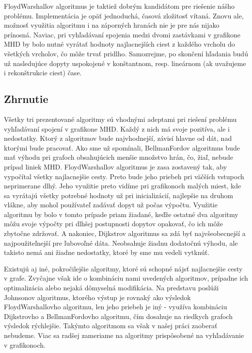 Floyd\textendash Warshallov algoritmus je taktiež dobrým kandidátom pre riešenie nášho problému. Implementácia je opäť jednoduchá, časová zložitosť vítaná. Znovu ale, možnosť využitia algoritmu i na záporných hranách nie je pre nás nijako prínosná. Naviac, pri vyhľadávaní spojenia medzi dvomi zastávkami v grafikone MHD by bolo nutné vyrátať hodnoty najlacnejších ciest z každého vrcholu do všetkých vrcholov, čo môže trvať pridlho. Samozrejme, po skončení hľadania budú už nasledujúce dopyty uspokojené v konštantnom, resp. lineárnom (ak uvažujeme i rekonštrukcie ciest) čase.\newline


\subsection{Zhrnutie}
\label{vyhlad_alg_zhrnutie}

Všetky tri prezentované algoritmy sú vhodnými adeptami pri riešení problému vyhľadávaní spojení v grafikone MHD. Každý z nich má svoje pozitíva, ale i nedostatky. Ktorý z algoritmov bude najvhodnejší, závisí hlavne od dát, nad ktorými bude pracovať. Ako sme už spomínali, Bellman\textendash Fordov algoritmus bude mať výhodu pri grafoch obsahujúcich menšie množstvo hrán, čo, žiaľ, nebude prípad liniek MHD. Floyd\textendash Warshallov algoritmus je zasa zostavený tak, aby vypočítal všetky najlacnejšie cesty. Preto bude jeho priebeh pri väčších vstupoch neprimerane dlhý. Jeho využitie preto vidíme pri grafikonoch malých miest, kde sa vyrátajú všetky potrebné hodnoty už pri inicializácií, najlepšie na druhom vlákne, aby mohol používateľ zadávať dopyt už počas výpočtu. Využitie algoritmu by bolo v tomto prípade priam žiadané, keďže ostatné dva algoritmy môžu svoje výpočty pri dlhšej postupnosti dopytov opakovať, čo ich môže zbytočne zdržovať. A nakoniec, Dijkstrov algoritmus sa zdá byť najvšeobecnejší a najpoužiteľnejší pre ľubovoľné dáta. Neobsahuje žiadnu dodatočnú výhodu, ale takisto nemá ani žiadne nedostatky, ktoré by sme mu vedeli vytknúť.\newline

Existujú aj iné, pokročilejšie algoritmy, ktoré sú schopné nájsť najlacnejšie cesty v grafe. Zvyčajne však ide o kombináciu nami uvedených algoritmov, prípadne ich optimalizácia alebo nejaká dômyselná modifikácia. Na predstavu poslúži Johnsonov algoritmus, ktorého výstup je rovnaký ako výsledok Floyd\textendash Warshallovho algoritmu, len jeho priebeh je iný - využíva kombináciu Dijkstrovho a Bellman\textendash Fordovho algoritmu, čím dosahuje na riedkych grafoch výsledok rýchlejšie. Takýmto algoritmom sa však v našej práci zaoberať nebudeme. Viac sa radšej zameriame na algoritmy prispôsobené na vyhľadávanie v grafikonoch.\newline


